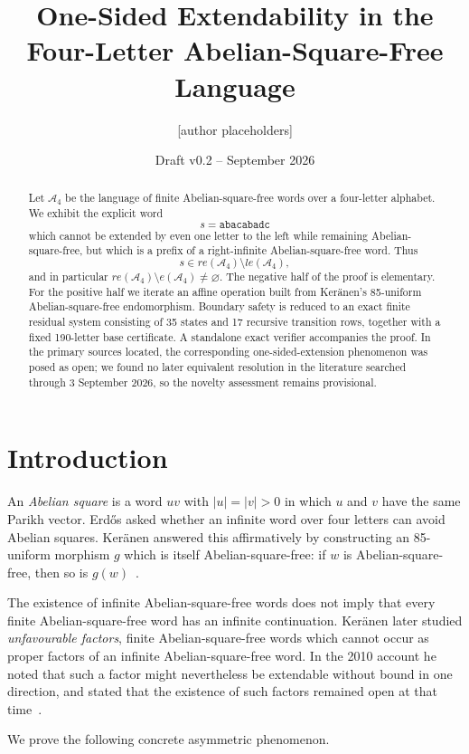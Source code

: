 \documentclass[11pt]{article}
\title{One-Sided Extendability in the Four-Letter Abelian-Square-Free Language}
\author{[author placeholders]}
\date{Draft v0.2 -- September 2026}
\theoremstyle{definition}
\newcommand{\A}{\mathcal A_4}
\newcommand{\code}[1]{\texttt{#1}}
\begin{document}
\maketitle

\begin{abstract}
Let $\A$ be the language of finite Abelian-square-free words over a four-letter alphabet. We exhibit the explicit word
\[
s=\code{abacabadc}
\]
which cannot be extended by even one letter to the left while remaining Abelian-square-free, but which is a prefix of a right-infinite Abelian-square-free word. Thus
\[
s\in re(\A)\setminus le(\A),
\]
and in particular $re(\A)\setminus e(\A)\neq\varnothing$. The negative half of the proof is elementary. For the positive half we iterate an affine operation built from Ker\"anen's 85-uniform Abelian-square-free endomorphism. Boundary safety is reduced to an exact finite residual system consisting of 35 states and 17 recursive transition rows, together with a fixed 190-letter base certificate. A standalone exact verifier accompanies the proof. In the primary sources located, the corresponding one-sided-extension phenomenon was posed as open; we found no later equivalent resolution in the literature searched through 3 September 2026, so the novelty assessment remains provisional.
\end{abstract}

\section{Introduction}

An \emph{Abelian square} is a word $uv$ with $|u|=|v|>0$ in which $u$ and $v$ have the same Parikh vector. Erd\H{o}s asked whether an infinite word over four letters can avoid Abelian squares. Ker\"anen answered this affirmatively by constructing an 85-uniform morphism $g$ which is itself Abelian-square-free: if $w$ is Abelian-square-free, then so is $g(w)$~\cite{Keranen1992}.

The existence of infinite Abelian-square-free words does not imply that every finite Abelian-square-free word has an infinite continuation. Ker\"anen later studied \emph{unfavourable factors}, finite Abelian-square-free words which cannot occur as proper factors of an infinite Abelian-square-free word. In the 2010 account he noted that such a factor might nevertheless be extendable without bound in one direction, and stated that the existence of such factors remained open at that time~\cite{Keranen2010}.

We prove the following concrete asymmetric phenomenon.
\end{document}
